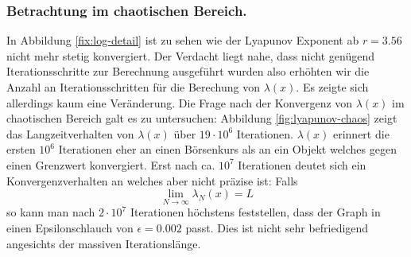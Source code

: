 \documentclass[12pt,a4paper]{article}
\begin{document}
\subsubsection{Betrachtung im chaotischen Bereich.}
In Abbildung \ref{fix:log-detail} ist zu sehen wie der Lyapunov Exponent ab $r=3.56$ nicht mehr stetig konvergiert. 
Der Verdacht liegt nahe, dass nicht genügend Iterationsschritte zur Berechnung ausgeführt wurden also erhöhten wir die Anzahl an Iterationsschritten für die Berechung von $\lambda(x)$. Es zeigte sich allerdings kaum eine Veränderung. Die Frage nach der Konvergenz von $\lambda(x)$ im chaotischen Bereich galt es zu untersuchen: Abbildung \ref{fig:lyapunov-chaos} zeigt das Langzeitverhalten von $\lambda(x)$ über $19\cdot10^6$ Iterationen. $\lambda(x)$ erinnert die ersten $10^6$ Iterationen eher an einen Börsenkurs als an ein Objekt welches gegen einen Grenzwert konvergiert. Erst nach ca. $10^7$ Iterationen deutet sich ein Konvergenzverhalten an welches aber nicht präzise ist: Falls 
\begin{equation}
\lim_{N \rightarrow \infty} \lambda_N(x) = L
\end{equation}
so kann man nach $2\cdot10^7$ Iterationen höchstens feststellen, dass der Graph in einen Epsilonschlauch von $\epsilon=0.002$ passt. Dies ist nicht sehr befriedigend angesichts der massiven Iterationslänge.
\end{document}
